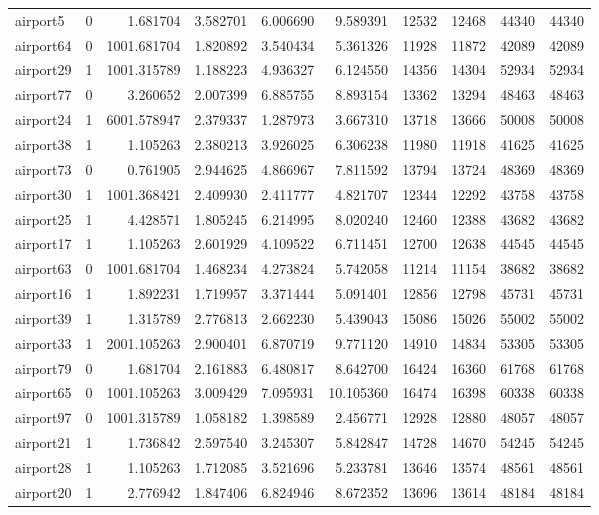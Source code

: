 \begin{longtable}{|l|r|r|r|r|r|r|r|r|r|}
airport5 & 0 & 1.681704 & 3.582701 & 6.006690 & 9.589391 & 12532 & 12468 & 44340 & 44340 \\
airport64 & 0 & 1001.681704 & 1.820892 & 3.540434 & 5.361326 & 11928 & 11872 & 42089 & 42089 \\
airport29 & 1 & 1001.315789 & 1.188223 & 4.936327 & 6.124550 & 14356 & 14304 & 52934 & 52934 \\
airport77 & 0 & 3.260652 & 2.007399 & 6.885755 & 8.893154 & 13362 & 13294 & 48463 & 48463 \\
airport24 & 1 & 6001.578947 & 2.379337 & 1.287973 & 3.667310 & 13718 & 13666 & 50008 & 50008 \\
airport38 & 1 & 1.105263 & 2.380213 & 3.926025 & 6.306238 & 11980 & 11918 & 41625 & 41625 \\
airport73 & 0 & 0.761905 & 2.944625 & 4.866967 & 7.811592 & 13794 & 13724 & 48369 & 48369 \\
airport30 & 1 & 1001.368421 & 2.409930 & 2.411777 & 4.821707 & 12344 & 12292 & 43758 & 43758 \\
airport25 & 1 & 4.428571 & 1.805245 & 6.214995 & 8.020240 & 12460 & 12388 & 43682 & 43682 \\
airport17 & 1 & 1.105263 & 2.601929 & 4.109522 & 6.711451 & 12700 & 12638 & 44545 & 44545 \\
airport63 & 0 & 1001.681704 & 1.468234 & 4.273824 & 5.742058 & 11214 & 11154 & 38682 & 38682 \\
airport16 & 1 & 1.892231 & 1.719957 & 3.371444 & 5.091401 & 12856 & 12798 & 45731 & 45731 \\
airport39 & 1 & 1.315789 & 2.776813 & 2.662230 & 5.439043 & 15086 & 15026 & 55002 & 55002 \\
airport33 & 1 & 2001.105263 & 2.900401 & 6.870719 & 9.771120 & 14910 & 14834 & 53305 & 53305 \\
airport79 & 0 & 1.681704 & 2.161883 & 6.480817 & 8.642700 & 16424 & 16360 & 61768 & 61768 \\
airport65 & 0 & 1001.105263 & 3.009429 & 7.095931 & 10.105360 & 16474 & 16398 & 60338 & 60338 \\
airport97 & 0 & 1001.315789 & 1.058182 & 1.398589 & 2.456771 & 12928 & 12880 & 48057 & 48057 \\
airport21 & 1 & 1.736842 & 2.597540 & 3.245307 & 5.842847 & 14728 & 14670 & 54245 & 54245 \\
airport28 & 1 & 1.105263 & 1.712085 & 3.521696 & 5.233781 & 13646 & 13574 & 48561 & 48561 \\
airport20 & 1 & 2.776942 & 1.847406 & 6.824946 & 8.672352 & 13696 & 13614 & 48184 & 48184 \\

\end{longtable}
